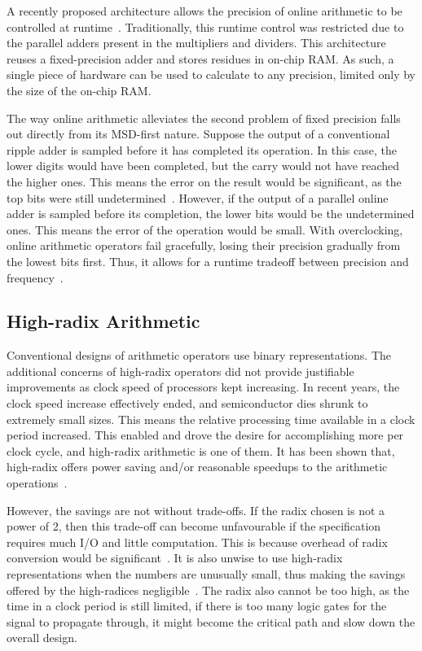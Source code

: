 A recently proposed architecture allows the precision of
online arithmetic to be controlled at runtime~\cite{Zhao1}.
Traditionally, this runtime control was restricted due to the parallel adders
present in the multipliers and dividers.
This architecture reuses a fixed-precision adder and stores residues in
on-chip RAM.
As such, a single piece of hardware can be used to calculate to any precision,
limited only by the size of the on-chip RAM.

The way online arithmetic alleviates the second problem of fixed precision
falls out directly from its MSD-first nature.
Suppose the output of a conventional ripple adder is sampled before
it has completed its operation.
In this case, the lower digits would have been completed, but the carry would
not have reached the higher ones.
This means the error on the result would be significant, as the top bits
were still undetermined~\cite{Shi1}.
However, if the output of a parallel online adder is sampled before its
completion, the lower bits would be the undetermined ones.
This means the error of the operation would be small.
With overclocking, online arithmetic operators fail gracefully, losing their
precision gradually from the lowest bits first.
Thus, it allows for a runtime tradeoff between precision and
frequency~\cite{Shi2}.

\subsection{High-radix Arithmetic}
Conventional designs of arithmetic operators use binary representations.
The additional concerns of high-radix operators did not provide justifiable
improvements as clock speed of processors kept increasing.
In recent years, the clock speed increase effectively ended, and semiconductor
dies shrunk to extremely small sizes.
This means the relative processing time available in a clock period increased.
This enabled and drove the desire for accomplishing more per clock cycle, and
high-radix arithmetic is one of them.
It has been shown that, high-radix offers power saving and/or reasonable
speedups to the arithmetic operations~\cite{Catanzaro1}\cite{Amin1}\cite{Chen1}.

However, the savings are not without trade-offs.
If the radix chosen is not a power of 2, then this trade-off can become
unfavourable if the specification requires much I/O
and little computation.
This is because overhead of radix conversion would be significant~\cite{Whyte1}.
It is also unwise to use high-radix representations when the numbers are
unusually small, thus making the savings offered by the high-radices
negligible~\cite{Catanzaro1}.
The radix also cannot be too high, as the time in a clock period is still
limited, if there is too many logic gates for the signal to propagate through,
it might become the critical path and slow down the overall design.

